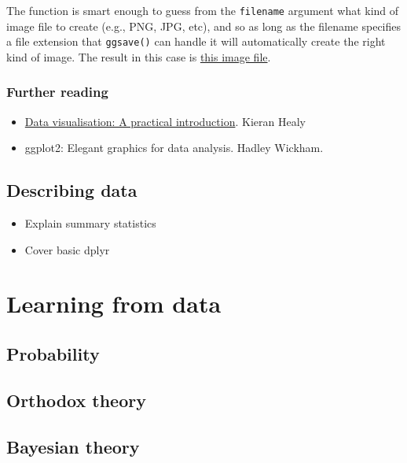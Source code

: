 \documentclass[]{book}
\providecommand{\tightlist}{%
  \setlength{\itemsep}{0pt}\setlength{\parskip}{0pt}}
\begin{document}
The function is smart enough to guess from the \texttt{filename} argument what kind of image file to create (e.g., PNG, JPG, etc), and so as long as the filename specifies a file extension that \texttt{ggsave()} can handle it will automatically create the right kind of image. The result in this case is \href{./output/frame_pic.png}{this image file}.

\hypertarget{further-reading}{%
\section{Further reading}\label{further-reading}}

\begin{itemize}
\tightlist
\item
  \href{https://socviz.co/}{Data visualisation: A practical introduction}. Kieran Healy
\item
  ggplot2: Elegant graphics for data analysis. Hadley Wickham.
\end{itemize}

\hypertarget{descriptives}{%
\chapter{Describing data}\label{descriptives}}

\begin{itemize}
\tightlist
\item
  Explain summary statistics
\item
  Cover basic dplyr
\end{itemize}

\hypertarget{part-learning-from-data}{%
\part{Learning from data}\label{part-learning-from-data}}

\hypertarget{probability}{%
\chapter{Probability}\label{probability}}

\hypertarget{orthodox}{%
\chapter{Orthodox theory}\label{orthodox}}

\hypertarget{bayes}{%
\chapter{Bayesian theory}\label{bayes}}
\end{document}
